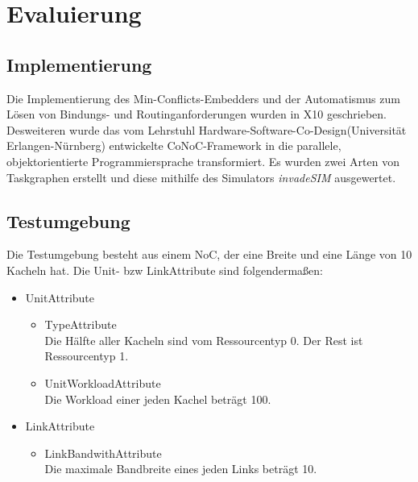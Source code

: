 \chapter{Evaluierung}\label{evaluierung}

\section{Implementierung} \label{Tests}
Die Implementierung des Min-Conflicts-Embedders und der Automatismus zum Lösen von Bindungs- und Routinganforderungen wurden in X10 \cite{x10} geschrieben. Desweiteren wurde das vom Lehrstuhl \grqq Hardware-Software-Co-Design\grqq (Universität Erlangen-Nürnberg) entwickelte CoNoC-Framework in die parallele, objektorientierte Programmiersprache transformiert. Es wurden zwei Arten von Taskgraphen erstellt und diese mithilfe des Simulators \textit{invadeSIM} \cite{invadeSIM}  ausgewertet.





\section{Testumgebung} \label{Testumgebung1} 
Die Testumgebung besteht aus einem NoC, der  eine Breite und eine Länge von 10 Kacheln hat. Die Unit- bzw LinkAttribute sind folgendermaßen:
\\
\begin{itemize}
\item UnitAttribute
\begin{itemize}
\item TypeAttribute\\
Die Hälfte aller Kacheln sind vom Ressourcentyp 0. Der Rest ist Ressourcentyp 1.
\item UnitWorkloadAttribute\\
Die Workload einer jeden Kachel beträgt 100.

\end{itemize}
\item LinkAttribute
\begin{itemize}
\item LinkBandwithAttribute\\
Die maximale Bandbreite eines jeden Links beträgt 10.
\end{itemize}
\end{itemize}

